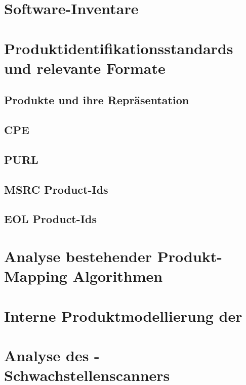 \section{Software-Inventare}\label{sec:def-inventories}




\section{Produktidentifikationsstandards und relevante Formate}

\subsection{Produkte und ihre Repräsentation}


\subsection{CPE}

\subsection{PURL}

\subsection{MSRC Product-Ids}

\subsection{EOL Product-Ids}


\section{Analyse bestehender Produkt-Mapping Algorithmen}



\section{Interne Produktmodellierung der \metaeffektlg}


\section{Analyse des \metaeffektlg-Schwachstellenscanners}
